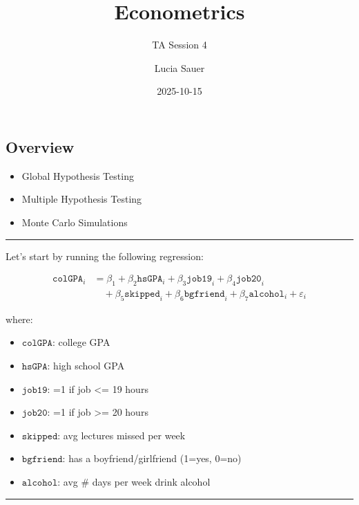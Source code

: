 \documentclass[
  letterpaper,
  DIV=11,
  numbers=noendperiod]{scrartcl}
\title{Econometrics}
\subtitle{{TA Session 4}}
\author{Lucia Sauer}
\date{2025-10-15}
\providecommand{\tightlist}{%
  \setlength{\itemsep}{0pt}\setlength{\parskip}{0pt}}
\begin{document}
\maketitle


\subsection{Overview}\label{overview}

\begin{itemize}
\tightlist
\item
  Global Hypothesis Testing
\item
  Multiple Hypothesis Testing
\item
  Monte Carlo Simulations
\end{itemize}

\begin{center}\rule{0.5\linewidth}{0.5pt}\end{center}

Let's start by running the following regression:

\[\begin{equation}
\begin{split}
\texttt{colGPA}_i &= \beta_1 + \beta_2\texttt{hsGPA}_i + \beta_3\texttt{job19}_i + \beta_4\texttt{job20}_i \\
&\quad + \beta_5\texttt{skipped}_i + \beta_6\texttt{bgfriend}_i + \beta_7\texttt{alcohol}_i + \varepsilon_i
\end{split}
\end{equation}\]

where:

\begin{itemize}
\tightlist
\item
  \(\texttt{colGPA}\): college GPA
\item
  \(\texttt{hsGPA}\): high school GPA
\item
  \(\texttt{job19}\): =1 if job \textless= 19 hours
\item
  \(\texttt{job20}\): =1 if job \textgreater= 20 hours
\item
  \(\texttt{skipped}\): avg lectures missed per week
\item
  \(\texttt{bgfriend}\): has a boyfriend/girlfriend (1=yes, 0=no)
\item
  \(\texttt{alcohol}\): avg \# days per week drink alcohol
\end{itemize}

\begin{center}\rule{0.5\linewidth}{0.5pt}\end{center}
\end{document}
